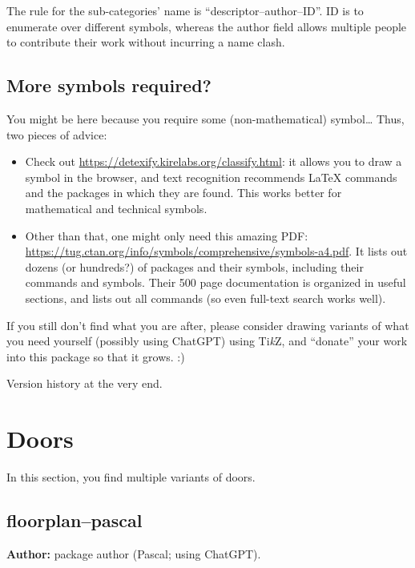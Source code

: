 \documentclass{article}
\begin{document}
The rule for the sub-categories' name is ``descriptor--author--ID''. ID is to enumerate over different symbols, whereas the author field allows multiple people to contribute their work without incurring a name clash.

\subsection*{More symbols required?}

You might be here because you require some (non-mathematical) symbol\dots{} Thus, two pieces of advice:

\begin{itemize}
  \item Check out \url{https://detexify.kirelabs.org/classify.html}: it allows you to draw a symbol in the browser, and text recognition recommends \LaTeX{} commands and the packages in which they are found. This works better for mathematical and technical symbols.
  \item Other than that, one might only need this amazing PDF:
  \url{https://tug.ctan.org/info/symbols/comprehensive/symbols-a4.pdf}. 
  It lists out dozens (or hundreds?) of packages and their symbols, including their commands and symbols. Their 500 page documentation is organized in useful sections, and lists out all commands (so even full-text search works well).
\end{itemize}

If you still don't find what you are after, please consider drawing variants of what you need yourself (possibly using ChatGPT) using Ti\textit{k}Z, and ``donate'' your work into this package so that it grows. :)

Version history at the very end.

\clearpage

\section{Doors}

In this section, you find multiple variants of doors.


\subsection{floorplan--pascal}

\textbf{Author:} package author (Pascal; using ChatGPT).
\end{document}
